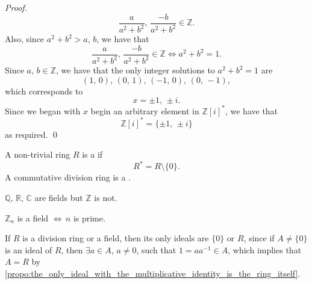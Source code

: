 \begin{eg}
\begin{proof}
      \begin{equation*}
        \frac{a}{a^2 + b^2}, \, \frac{-b}{a^2 + b^2} \in \mathbb{Z}.
      \end{equation*}
      Also, since $a^2 + b^2 > a, \, b$, we have that
      \begin{equation*}
        \frac{a}{a^2 + b^2}, \, \frac{-b}{a^2 + b^2} \in \mathbb{Z} \iff a^2 + b^2 = 1.
      \end{equation*}
      Since $a, \, b \in \mathbb{Z}$, we have that the only integer solutions to $a^2 + b^2 = 1$ are
      \begin{equation*}
        (1, \, 0) , \, (0, \, 1) , \, ( -1, \, 0 ) , \, (0, \, -1),
      \end{equation*}
      which corresponds to
      \begin{equation*}
        x = \pm 1, \, \pm i.
      \end{equation*}
      Since we began with $x$ begin an arbitrary element in $\mathbb{Z}[i]^*$, we have that
      \begin{equation*}
        \mathbb{Z}[i]^* = \{ \pm 1, \, \pm i \}
      \end{equation*}
      as required.
    \qed
  \end{proof}
\end{eg}

\begin{defn}
\label{defn:division_ring_and_field}
  A non-trivial ring $R$ is a  if
  \begin{equation*}
    R^* = R \setminus \{0\}.
  \end{equation*}
  A commutative division ring is a .
\end{defn}

\begin{eg}
  $\mathbb{Q}, \, \mathbb{R}, \, \mathbb{C}$ are fields but $\mathbb{Z}$ is not.
\end{eg}

\begin{eg}
  $\mathbb{Z}_n$ is a field $\iff \, n$ is prime.
\end{eg}

\begin{remark}
 If $R$ is a division ring or a field, then its only ideals are $\{0\}$ or $R$, since if $A \neq \{0\}$ is an ideal of $R$, then $\exists a \in A$, $a \neq 0$, such that $1 = aa^{-1} \in A$, which implies that $A = R$ by \cref{propo:the_only_ideal_with_the_multiplicative_identity_is_the_ring_itself}.
\end{remark}


